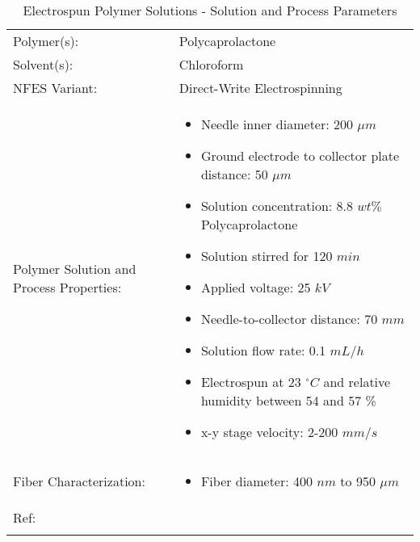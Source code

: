 \begin{table}[th]
\caption{Electrospun Polymer Solutions - Solution and Process Parameters}
\begin{center}
\begin{tabular}{
>{\raggedright\arraybackslash}p{}
>{\raggedright\arraybackslash}p{} }

\hline
Polymer(s): &
Polycaprolactone \\

\arrayrulecolor{lightgray}\hline
Solvent(s): &
Chloroform \\

\hline
NFES Variant: &
Direct-Write Electrospinning \\

\hline
Polymer Solution and Process Properties: &
\begin{itemize}[leftmargin=*]
\item Needle inner diameter: 200 $\mu m$
\item Ground electrode to collector plate distance: 50 $\mu m$
\item Solution concentration: 8.8 $w t \%$ Polycaprolactone
\item Solution stirred for 120 $min$
\item Applied voltage: 25 $k V$
\item Needle-to-collector distance: 70 $m m$
\item Solution flow rate: 0.1 $m L / h$
\item Electrospun at 23 $^\circ C$ and relative humidity between 54 and 57 \%
\item x-y stage velocity: 2-200 $m m / s$
\end{itemize} \\

\hline
Fiber Characterization: &
\begin{itemize}[leftmargin=*]
\item Fiber diameter: 400 $n m$ to 950 $\mu m$
\end{itemize} \\

\hline
Ref: & \cite{Lee2012} \\ %
\arrayrulecolor{black}\hline
\label{tbl:FloresCompare}
\end{tabular}
\end{center}
\end{table}

